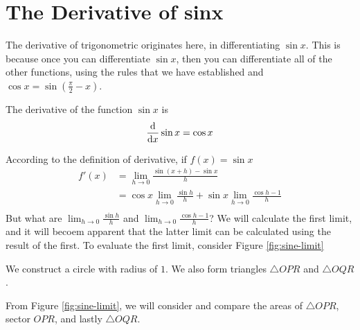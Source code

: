 \documentclass[working]{tuftebook}
\begin{document}
\section{The Derivative of sinx}
The derivative of trigonometric originates here, in differentiating $ \sin x$. This is because once you can differentiate $ \sin x$, then you can differentiate all of the other functions, using the rules that we have established and $ \cos x= \sin ( \frac{\pi}{2}-x)$. 
\begin{theorem}
    The derivative of the function $ \sin x$ is
    \[
        \dv{}{x} \sin x= \cos x
    \]
\end{theorem}
\begin{myproof}
    According to the definition of derivative, if $f(x)= \sin x$ 
    \begin{align*}
        f'(x)&= \lim_{h\to 0} \frac{ \sin(x+h)- \sin x}{h}\\ 
             &= \cos x \lim_{h\to 0} \frac{ \sin h}{h}+ \sin x \lim_{h\to 0} \frac{ \cos h-1}{h}\\
    \end{align*}
    But what are $ \lim_{h\to 0} \frac{ \sin h}{h}$ and $ \lim_{h\to 0} \frac{ \cos h-1}{h}$? We will calculate the first limit, and it will becoem apparent that the latter limit can be calculated using the result of the first. To evaluate the first limit, consider Figure \ref{fig:sine-limit} 

\begin{marginfigure}
    \centering
    \caption{We construct a circle with radius of $1$. We also form triangles $\triangle OPR$ and $\triangle OQR$.}
    \label{fig:sine-limit}
\end{marginfigure}

From Figure \ref{fig:sine-limit}, we will consider and compare the areas of $\triangle OPR$, sector $OPR$, and lastly $\triangle OQR$. 


\end{myproof}
\end{document}
